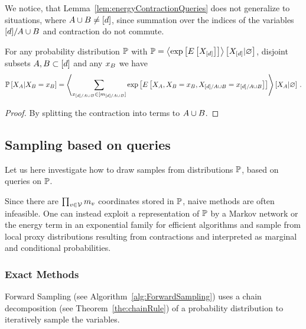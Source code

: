 % 
We notice, that Lemma~\ref{lem:energyContractionQueries} does not generalize to situations, where $A\cup B\neq[d]$, since summation over the indices of the variables $[d]/A\cup B$ and contraction do not commute.


\begin{lemma}  %
	For any probability distribution $\mathbb{P}$ with $\mathbb{P}= \left\langle \mathrm{exp}\left[E\left[X_{[d]}\right]\right]\right\rangle \left[ X_{[d]} | \varnothing \right]$, disjoint subsets $A,B \subset [d]$ and any $x_{B}$ we have
		\[ \mathbb{P}\left[X_{A}|X_{B}=x_{B}\right] 
			=
			\left\langle 
			 \sum_{x_{[d]/A\cup B}\in[m_{[d]/A\cup B}]} 
				 \mathrm{exp}\left[E\left[X_{A},X_{B}=x_{B},X_{[d]/A\cup B}=x_{[d]/A\cup B}\right]\right]
		\right\rangle \left[ X_{A} | \varnothing \right] \, .\]
\end{lemma}
\begin{proof}
	By splitting the contraction into terms to $A\cup B$. %
\end{proof}




\subsection{Sampling based on queries}


Let us here investigate how to draw samples from distributions $\mathbb{P}$, based on queries on $\mathbb{P}$.

Since there are $\prod_{v\in\mathcal{V}}m_{v}$ coordinates stored in $\mathbb{P}$, naive methods are often infeasible.
One can instead exploit a representation of $\mathbb{P}$ by a Markov network or the energy term in an exponential family for efficient algorithms and sample from local proxy distributions resulting from contractions and interpreted as marginal and conditional probabilities.

\subsubsection{Exact Methods}

Forward Sampling (see Algorithm~\ref{alg:ForwardSampling}) uses a chain decomposition (see Theorem~\ref{the:chainRule}) of a probability distribution to iteratively sample the variables.

